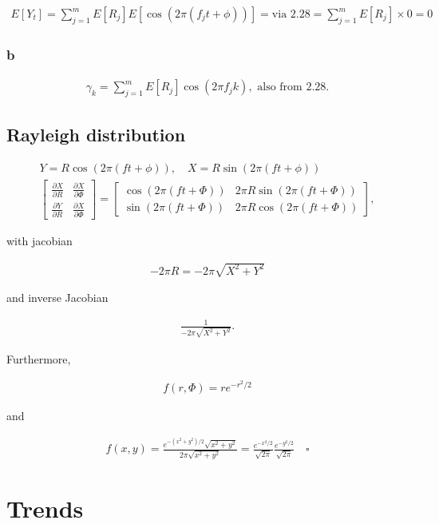 \documentclass[]{book}
\begin{document}
\begin{gather*}
  E[Y_t] = \sum_{j=1}^m E[R_j]E[\cos{(2\pi(f_j t+\phi))}] = \text{via 2.28} = \sum_{j=1}^m E[R_j] \times 0 = 0
\end{gather*}

\subsection*{b}\label{b-20}

\begin{gather*}
  \gamma_k = \sum_{j=1}^m E[R_j]\cos{(2\pi f_jk)}, \text{ also from 2.28.}
\end{gather*}

\section{Rayleigh distribution}\label{rayleigh-distribution}

\begin{gather*}
  Y = R\cos{(2\pi(ft + \phi))}, \quad X = R\sin{(2\pi(ft+\phi))}\\
  \begin{bmatrix}
    \frac{\partial X}{\partial R} & \frac{\partial X}{\partial \Phi} \\
    \frac{\partial Y}{\partial R} & \frac{\partial X}{\partial \Phi}
  \end{bmatrix} = 
  \begin{bmatrix}
    \cos{(2\pi(ft + \Phi))} & 2\pi R \sin{(2\pi(ft + \Phi))} \\
    \sin{(2\pi(ft + \Phi))} & 2\pi R \cos{(2\pi(ft + \Phi))}
  \end{bmatrix},
\end{gather*}

with jacobian

\begin{gather*}
  -2\pi R = -2\pi \sqrt{X^2 + Y^2}
\end{gather*}

and inverse Jacobian

\begin{gather*}
  \frac{1}{-2\pi \sqrt{X^2 + Y^2}}.
\end{gather*}

Furthermore,

\begin{gather*}
  f(r,\Phi) = re^{-r^2/2}
\end{gather*}

and

\begin{gather*} 
  f(x,y) = \frac{e^{-(x^2+y^2)/2}\sqrt{x^2 + y^2}}{2\pi \sqrt{x^2 + y^2}} = \frac{e^{-x^2/2}}{\sqrt{2\pi}}\frac{e^{-y^2/2}}{\sqrt{2\pi}} \quad \square
\end{gather*}

\chapter{Trends}\label{trends}
\end{document}

